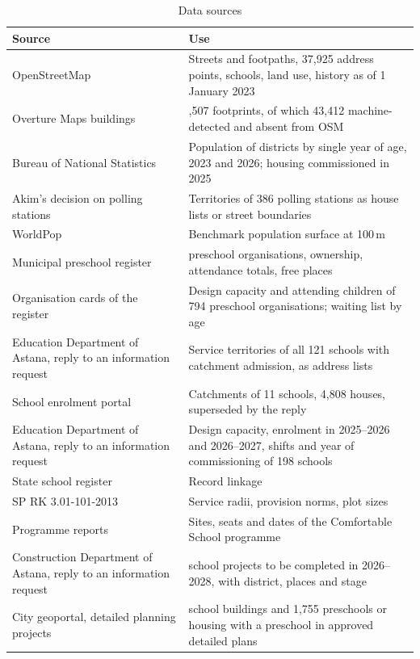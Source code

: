 \begin{table}[ht]
\centering
\caption{Data sources}
\label{tab:sources}
\small
\begin{tabularx}{\textwidth}{>{\raggedright\arraybackslash}p{4.2cm}>{\raggedright\arraybackslash}X}
\toprule
Source & Use \\
\midrule
OpenStreetMap \cite{osm2026} & Streets and footpaths, 37,925 address points, schools, land use, history as of 1 January 2023 \\
Overture Maps buildings \cite{overture2026} & 93,507 footprints, of which 43,412 machine-detected and absent from OSM \\
Bureau of National Statistics \cite{astanapop2026, statpop2023, statages2026, statconstruction2026} & Population of districts by single year of age, 2023 and 2026; housing commissioned in 2025 \\
Akim's decision on polling stations \cite{pollingstations2025} & Territories of 386 polling stations as house lists or street boundaries \\
WorldPop \cite{tatem2017, worldpop2025} & Benchmark population surface at 100\,m \\
Municipal preschool register \cite{indigo2026} & 790 preschool organisations, ownership, attendance totals, free places \\
Organisation cards of the register \cite{indigocards2026} & Design capacity and attending children of 794 preschool organisations; waiting list by age \\
Education Department of Astana, reply to an information request \cite{catchments2026} & Service territories of all 121 schools with catchment admission, as address lists \\
School enrolment portal \cite{sakura2026} & Catchments of 11 schools, 4,808 houses, superseded by the reply \\
Education Department of Astana, reply to an information request \cite{schoolregister2026} & Design capacity, enrolment in 2025--2026 and 2026--2027, shifts and year of commissioning of 198 schools \\
State school register \cite{egovschools} & Record linkage \\
SP RK 3.01-101-2013 \cite{sprk2013} & Service radii, provision norms, plot sizes \\
Programme reports \cite{skc2023, comfortschool2022} & Sites, seats and dates of the Comfortable School programme \\
Construction Department of Astana, reply to an information request \cite{constructionplan2026} & 25 school projects to be completed in 2026--2028, with district, places and stage \\
City geoportal, detailed planning projects \cite{geoportal2026} & 316 school buildings and 1,755 preschools or housing with a preschool in approved detailed plans \\
\bottomrule
\end{tabularx}
\end{table}

